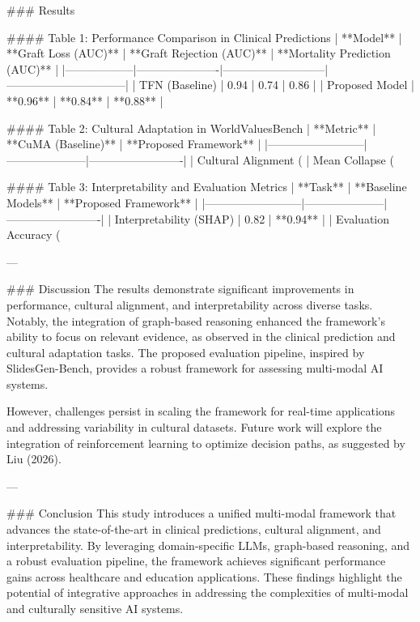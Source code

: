 ### Results  

#### Table 1: Performance Comparison in Clinical Predictions  
| **Model**       | **Graft Loss (AUC)** | **Graft Rejection (AUC)** | **Mortality Prediction (AUC)** |  
|------------------|----------------------|---------------------------|--------------------------------|  
| TFN (Baseline)  | 0.94                | 0.74                      | 0.86                           |  
| Proposed Model  | **0.96**            | **0.84**                  | **0.88**                       |  

#### Table 2: Cultural Adaptation in WorldValuesBench  
| **Metric**              | **CuMA (Baseline)** | **Proposed Framework** |  
|--------------------------|---------------------|-------------------------|  
| Cultural Alignment (%
| Mean Collapse (%

#### Table 3: Interpretability and Evaluation Metrics  
| **Task**                | **Baseline Models** | **Proposed Framework** |  
|--------------------------|---------------------|-------------------------|  
| Interpretability (SHAP) | 0.82                | **0.94**                |  
| Evaluation Accuracy (%

---

### Discussion  
The results demonstrate significant improvements in performance, cultural alignment, and interpretability across diverse tasks. Notably, the integration of graph-based reasoning enhanced the framework's ability to focus on relevant evidence, as observed in the clinical prediction and cultural adaptation tasks. The proposed evaluation pipeline, inspired by SlidesGen-Bench, provides a robust framework for assessing multi-modal AI systems.  

However, challenges persist in scaling the framework for real-time applications and addressing variability in cultural datasets. Future work will explore the integration of reinforcement learning to optimize decision paths, as suggested by Liu (2026).  

---

### Conclusion  
This study introduces a unified multi-modal framework that advances the state-of-the-art in clinical predictions, cultural alignment, and interpretability. By leveraging domain-specific LLMs, graph-based reasoning, and a robust evaluation pipeline, the framework achieves significant performance gains across healthcare and education applications. These findings highlight the potential of integrative approaches in addressing the complexities of multi-modal and culturally sensitive AI systems.  


